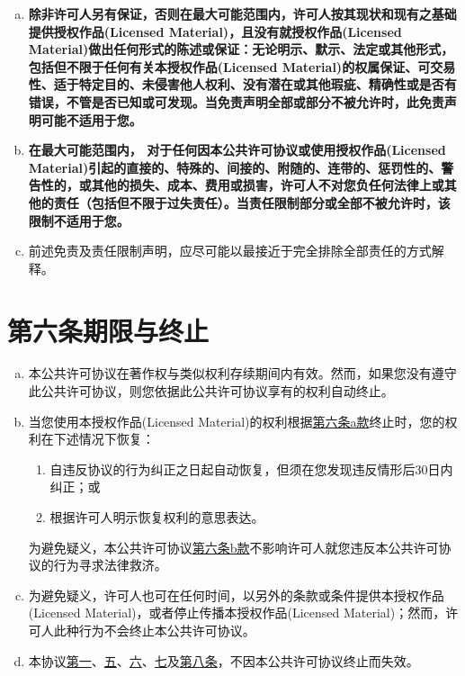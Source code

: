 \begin{enumerate}[a.]
    \item \textbf{除非许可人另有保证，否则在最大可能范围内，许可人按其现状和现有之基础提供授权作品(Licensed Material)，且没有就授权作品(Licensed Material)做出任何形式的陈述或保证：无论明示、默示、法定或其他形式，包括但不限于任何有关本授权作品(Licensed Material)的权属保证、可交易性、适于特定目的、未侵害他人权利、没有潜在或其他瑕疵、精确性或是否有错误，不管是否已知或可发现。当免责声明全部或部分不被允许时，此免责声明可能不适用于您。}\label{entry:A.5.a}
    \item \textbf{在最大可能范围内， 对于任何因本公共许可协议或使用授权作品(Licensed Material)引起的直接的、特殊的、间接的、附随的、连带的、惩罚性的、警告性的，或其他的损失、成本、费用或损害，许可人不对您负任何法律上或其他的责任（包括但不限于过失责任）。当责任限制部分或全部不被允许时，该限制不适用于您。}\label{entry:A.5.b}
    \item 前述免责及责任限制声明，应尽可能以最接近于完全排除全部责任的方式解释。\label{entry:A.5.c}
\end{enumerate}

\section*{第六条\;期限与终止} \label{section:A.6}

\begin{enumerate}[a.]
    \item 本公共许可协议在著作权与类似权利存续期间内有效。然而，如果您没有遵守此公共许可协议，则您依据此公共许可协议享有的权利自动终止。\label{entry:A.6.a}
    \item 当您使用本授权作品(Licensed Material)的权利根据\hyperref[entry:A.6.a]{第六条a款}终止时，您的权利在下述情况下恢复： \label{entry:A.6.b}
    \begin{enumerate}[1.]
        \item 自违反协议的行为纠正之日起自动恢复，但须在您发现违反情形后30日内纠正；或 \label{entry:A.6.b.1}
        \item 根据许可人明示恢复权利的意思表达。\label{entry:A.6.b.2}
    \end{enumerate}

    为避免疑义，本公共许可协议\hyperref[entry:A.6.b]{第六条b款}不影响许可人就您违反本公共许可协议的行为寻求法律救济。

    \item 为避免疑义，许可人也可在任何时间，以另外的条款或条件提供本授权作品(Licensed Material)，或者停止传播本授权作品(Licensed Material)；然而，许可人此种行为不会终止本公共许可协议。\label{entry:A.6.c}
    \item 本协议\hyperref[section:A.1]{第一}、\hyperref[section:A.5]{五}、\hyperref[section:A.6]{六}、\hyperref[section:A.7]{七}及\hyperref[section:A.8]{第八条}，不因本公共许可协议终止而失效。\label{entry:A.6.d}
\end{enumerate}

